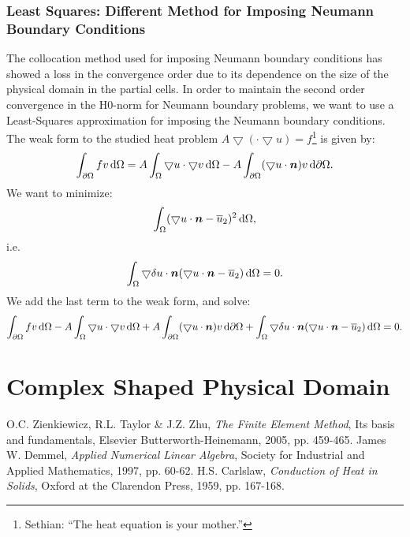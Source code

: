 \documentclass[a4paper,12pt]{article}
\newcommand{\mb}[1]{{\mbox{\boldmath$#1$\unboldmath}}}
\newcommand{\intd}{\,{\rm d}}
\begin{document}
\subsubsection{Least Squares: Different Method for Imposing Neumann Boundary Conditions}
The collocation method used for imposing Neumann boundary conditions has showed a loss in the convergence order due to its
dependence on the size of the physical domain in the partial cells. In order to maintain the second order convergence in the H$0$-norm for Neumann boundary problems, we want to use a Least-Squares approximation for 
imposing the Neumann boundary conditions.\\
The weak form to the studied heat problem $ A \bigtriangledown (\cdot \bigtriangledown u) = f$\footnote{Sethian: ``The heat equation is your mother.''} is given by:
\begin{equation}
\int_{\partial\Omega} fv \intd \Omega = A\int_{\Omega} \bigtriangledown u\cdot\bigtriangledown v\intd \Omega - A\int_{ \partial \Omega} (\bigtriangledown u\cdot\mb{n}) v\intd \partial \Omega.
\end{equation}
We want to minimize:
\begin{equation}
\int_{\Omega} (\bigtriangledown u\cdot\mb{n} - \overline{u}_2)^2 \intd \Omega, 
\end{equation}
i.e.
\begin{equation}
\int_{\Omega} \bigtriangledown\delta u\cdot\mb{n}  (\bigtriangledown u\cdot\mb{n} - \overline{u}_2) \intd \Omega = 0.
\end{equation}
We add the last term to the weak form, and solve:
\begin{equation}
\int_{\partial\Omega} fv \intd \Omega - A\int_{\Omega} \bigtriangledown u\cdot\bigtriangledown v\intd \Omega + A\int_{ \partial \Omega} (\bigtriangledown u\cdot\mb{n}) v\intd \partial \Omega + \int_{\Omega} \bigtriangledown\delta u\cdot\mb{n}  (\bigtriangledown u\cdot\mb{n} - \overline{u}_2) \intd \Omega = 0.
\end{equation}
\section{Complex Shaped Physical Domain}
\newpage
\begin{thebibliography}{9}
 O.C. Zienkiewicz, R.L. Taylor \& J.Z. Zhu, \emph{The Finite Element Method}, Its basis and fundamentals, Elsevier Butterworth-Heinemann, 2005, pp. 459-465.
 James W. Demmel, \emph{Applied Numerical Linear Algebra}, Society for Industrial and Applied Mathematics, 1997, pp. 60-62.
 H.S. Carlslaw, \emph{Conduction of Heat in Solids}, Oxford at the Clarendon Press, 1959, pp. 167-168.
\end{thebibliography}
\end{document}
